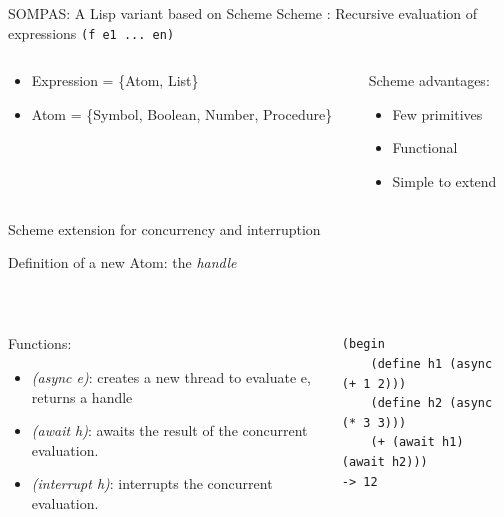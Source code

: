 
\begin{frame}[fragile]{SOMPAS: A Lisp variant based on Scheme}
    \centering
    Scheme : Recursive evaluation of expressions \verb|(f e1 ... en)|
    

    \begin{columns}[t]
        \begin{column}{0.6\textwidth}
        \begin{itemize}
            \item Expression = \{Atom, List\}
            \item Atom = \{Symbol, Boolean, Number, Procedure\}
        \end{itemize}

        \end{column}
        \begin{column}{0.4\textwidth}
            Scheme advantages:
            \begin{itemize}
                \item Few primitives
                \item Functional
                \item Simple to extend
            \end{itemize}
        \end{column}
     \end{columns}

\end{frame}

\begin{frame}[fragile]{Scheme extension for concurrency and interruption}

    Definition of a new Atom: the \emph{handle}
    
    ~~

    \begin{columns}
        \begin{column}{0.6\textwidth}
            Functions:
            \begin{itemize}
                \item \textit{(async e)}: creates a new thread to evaluate e, returns a handle
                \item \textit{(await h)}: awaits the result of the concurrent evaluation.
                \item \textit{(interrupt h)}: interrupts the concurrent evaluation.
            \end{itemize}
        \end{column}
        \begin{column}{0.4\textwidth}
\small
\lstset{columns=fullflexible}
            \begin{lstlisting}
(begin
    (define h1 (async (+ 1 2)))
    (define h2 (async (* 3 3)))
    (+ (await h1) (await h2)))
-> 12 
            \end{lstlisting}
        \end{column}
    \end{columns}
\end{frame}


